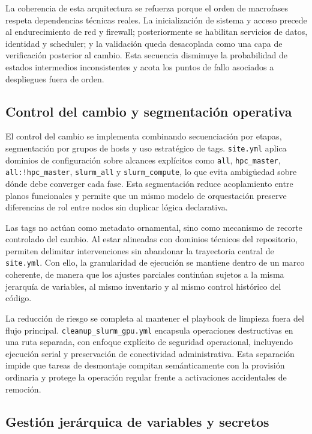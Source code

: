 La coherencia de esta arquitectura se refuerza porque el orden de macrofases respeta dependencias técnicas reales. La inicialización de sistema y acceso precede al endurecimiento de red y firewall; posteriormente se habilitan servicios de datos, identidad y scheduler; y la validación queda desacoplada como una capa de verificación posterior al cambio. Esta secuencia disminuye la probabilidad de estados intermedios inconsistentes y acota los puntos de fallo asociados a despliegues fuera de orden.

\subsection{Control del cambio y segmentación operativa}

El control del cambio se implementa combinando secuenciación por etapas, segmentación por grupos de hosts y uso estratégico de tags. \texttt{site.yml} aplica dominios de configuración sobre alcances explícitos como \texttt{all}, \texttt{hpc\_master}, \texttt{all:!hpc\_master}, \texttt{slurm\_all} y \texttt{slurm\_compute}, lo que evita ambigüedad sobre dónde debe converger cada fase. Esta segmentación reduce acoplamiento entre planos funcionales y permite que un mismo modelo de orquestación preserve diferencias de rol entre nodos sin duplicar lógica declarativa.

Las tags no actúan como metadato ornamental, sino como mecanismo de recorte controlado del cambio. Al estar alineadas con dominios técnicos del repositorio, permiten delimitar intervenciones sin abandonar la trayectoria central de \texttt{site.yml}. Con ello, la granularidad de ejecución se mantiene dentro de un marco coherente, de manera que los ajustes parciales continúan sujetos a la misma jerarquía de variables, al mismo inventario y al mismo control histórico del código.

La reducción de riesgo se completa al mantener el playbook de limpieza fuera del flujo principal. \texttt{cleanup\_slurm\_gpu.yml} encapsula operaciones destructivas en una ruta separada, con enfoque explícito de seguridad operacional, incluyendo ejecución serial y preservación de conectividad administrativa. Esta separación impide que tareas de desmontaje compitan semánticamente con la provisión ordinaria y protege la operación regular frente a activaciones accidentales de remoción.

\subsection{Gestión jerárquica de variables y secretos}

